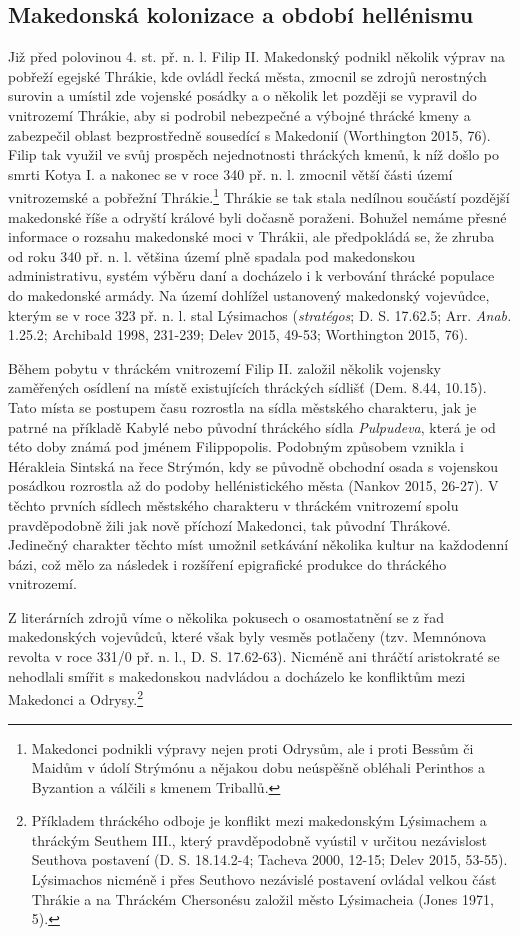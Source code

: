 
\subsection[makedonská-kolonizace-a-období-hellénismu]{Makedonská kolonizace a období hellénismu}

Již před polovinou 4. st. př. n. l. Filip II. Makedonský podnikl několik výprav na pobřeží egejské Thrákie, kde ovládl řecká města, zmocnil se zdrojů nerostných surovin a umístil zde vojenské posádky a o několik let později se vypravil do vnitrozemí Thrákie, aby si podrobil nebezpečné a výbojné thrácké kmeny a zabezpečil oblast bezprostředně sousedící s Makedonií (Worthington 2015, 76). Filip tak využil ve svůj prospěch nejednotnosti thráckých kmenů, k níž došlo po smrti Kotya I. a nakonec se v roce 340 př. n. l. zmocnil větší části území vnitrozemské a pobřežní Thrákie.\footnote{Makedonci podnikli výpravy nejen proti Odrysům, ale i proti Bessům či Maidům v údolí Strýmónu a nějakou dobu neúspěšně obléhali Perinthos a Byzantion a válčili s kmenem Triballů.} Thrákie se tak stala nedílnou součástí pozdější makedonské říše a odryští králové byli dočasně poraženi. Bohužel nemáme přesné informace o rozsahu makedonské moci v Thrákii, ale předpokládá se, že zhruba od roku 340 př. n. l. většina území plně spadala pod makedonskou administrativu, systém výběru daní a docházelo i k verbování thrácké populace do makedonské armády. Na území dohlížel ustanovený makedonský vojevůdce, kterým se v roce 323 př. n. l. stal Lýsimachos ({\em stratégos}; D. S. 17.62.5; Arr. {\em Anab.} 1.25.2; Archibald 1998, 231-239; Delev 2015, 49-53; Worthington 2015, 76).

Během pobytu v thráckém vnitrozemí Filip II. založil několik vojensky zaměřených osídlení na místě existujících thráckých sídlišť (Dem. 8.44, 10.15). Tato místa se postupem času rozrostla na sídla městského charakteru, jak je patrné na příkladě Kabylé nebo původní thráckého sídla {\em Pulpudeva}, která je od této doby známá pod jménem Filippopolis. Podobným způsobem vznikla i Hérakleia Sintská na řece Strýmón, kdy se původně obchodní osada s vojenskou posádkou rozrostla až do podoby hellénistického města (Nankov 2015, 26-27). V těchto prvních sídlech městského charakteru v thráckém vnitrozemí spolu pravděpodobně žili jak nově příchozí Makedonci, tak původní Thrákové. Jedinečný charakter těchto míst umožnil setkávání několika kultur na každodenní bázi, což mělo za následek i rozšíření epigrafické produkce do thráckého vnitrozemí.

Z literárních zdrojů víme o několika pokusech o osamostatnění se z řad makedonských vojevůdců, které však byly vesměs potlačeny (tzv. Memnónova revolta v roce 331/0 př. n. l., D. S. 17.62-63). Nicméně ani thráčtí aristokraté se nehodlali smířit s makedonskou nadvládou a docházelo ke konfliktům mezi Makedonci a Odrysy.\footnote{Příkladem thráckého odboje je konflikt mezi makedonským Lýsimachem a thráckým Seuthem III., který pravděpodobně vyústil v určitou nezávislost Seuthova postavení (D. S. 18.14.2-4; Tacheva 2000, 12-15; Delev 2015, 53-55). Lýsimachos nicméně i přes Seuthovo nezávislé postavení ovládal velkou část Thrákie a na Thráckém Chersonésu založil město Lýsimacheia (Jones 1971, 5).}

